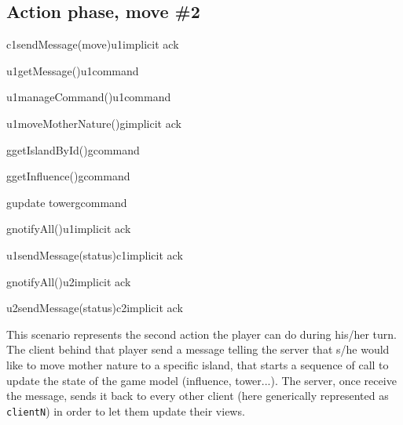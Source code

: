 \documentclass[a4paper]{article}
\begin{document}
	\pagebreak

	\subsection{Action phase, move \#2}

	\begin{center}
		\begin{sequencediagram}

			\begin{call}{c1}{sendMessage(move)}{u1}{implicit ack}
				\begin{call}{u1}{getMessage()}{u1}{command}
				\end{call}
				\begin{call}{u1}{manageCommand()}{u1}{command}
				\end{call}
				\begin{call}{u1}{moveMotherNature()}{g}{implicit ack}
					\begin{call}{g}{getIslandById()}{g}{command}
					\end{call}
					\begin{call}{g}{getInfluence()}{g}{command}
					\end{call}
					\begin{call}{g}{update tower}{g}{command}
					\end{call}
					\begin{call}{g}{notifyAll()}{u1}{implicit ack}
						\begin{call}{u1}{sendMessage(status)}{c1}{implicit ack}
						\end{call}
					\end{call}
					\begin{call}{g}{notifyAll()}{u2}{implicit ack}
						\begin{call}{u2}{sendMessage(status)}{c2}{implicit ack}
						\end{call}
					\end{call}
				\end{call}
			\end{call}
		\end{sequencediagram}
	\end{center}

	This scenario represents the second action the player can do during his/her turn. The client behind that player send a message telling the server that s/he would like to move mother nature to a specific island, that starts a sequence of call to update the state of the game model (influence, tower...). The server, once receive the message, sends it back to every other client (here generically represented as \verb|clientN|) in order to let them update their views.
\end{document}
